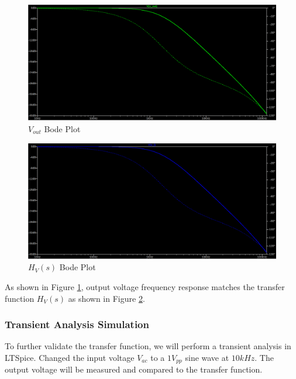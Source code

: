 \newpage
\thispagestyle{plain}

\begin{figure}[h]
    \centering
    \includegraphics[width=1\textwidth]{assets/rlc-v-out.png}
    \caption{$V_{out}$ Bode Plot}
    \label{fig:rlc_v_out_bode_plot}
\end{figure}
\begin{figure}[h]
    \centering
    \includegraphics[width=1\textwidth]{assets/rlc-v-l.png}
    \caption{$H_{V}(s)$ Bode Plot}
    \label{fig:rlc_v_laplace_bode_plot}
\end{figure}

As shown in Figure \ref{fig:rlc_v_out_bode_plot}, output voltage frequency response matches the transfer function $H_{V}(s)$ as shown in Figure \ref{fig:rlc_v_laplace_bode_plot}.

\newpage
\thispagestyle{plain}

\subsubsection{Transient Analysis Simulation}
To further validate the transfer function, we will perform a transient analysis in LTSpice. Changed the input voltage $V_{ac}$ to a $1V_{pp}$ sine wave at $10kHz$. The output voltage will be measured and compared to the transfer function.

